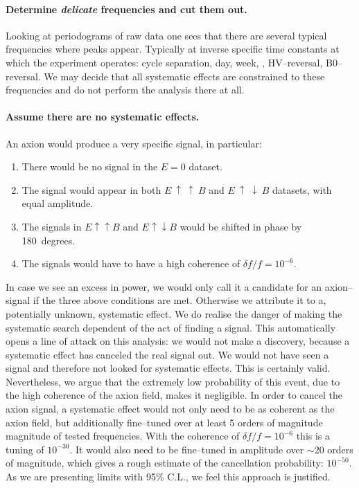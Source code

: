 \paragraph{Determine \emph{delicate} frequencies and cut them out.}
Looking at periodograms of raw data one sees that there are several typical frequencies where peaks appear. Typically at inverse specific time constants at which the experiment operates: cycle separation, day, week, , HV--reversal, B0--reversal. We may decide that all systematic effects are constrained to these frequencies and do not perform the analysis there at all.

\paragraph{Assume there are no systematic effects.}
An axion would produce a very specific signal, in particular:
\begin{enumerate}
  \item There would be no signal in the $E=0$ dataset.
  \item The signal would appear in both $E~\uparrow~\uparrow~B$ and $E~\uparrow~\downarrow~B$ datasets, with equal amplitude.
  \item The signals in $E \uparrow \uparrow B$ and $E \uparrow \downarrow B$ would be shifted in phase by 180~degrees.
  \item The signals would have to have a high coherence of $\delta f / f = 10^{-6}$.
\end{enumerate}
In case we see an excess in power, we would only call it a candidate for an axion--signal if the three above conditions are met. Otherwise we attribute it to a, potentially unknown, systematic effect. We do realise the danger of making the systematic search dependent of the act of finding a signal. This automatically opens a line of attack on this analysis: we would not make a discovery, because a systematic effect has canceled the real signal out. We would not have seen a signal and therefore not looked for systematic effects. This is certainly valid. Nevertheless, we argue that the extremely low probability of this event, due to the high coherence of the axion field, makes it negligible. In order to cancel the axion signal, a systematic effect would not only need to be as coherent as the axion field, but additionally fine--tuned over at least 5 orders of magnitude magnitude of tested frequencies. With the coherence of $\delta f / f = 10^{-6}$ this is a tuning of $10^{-30}$. It would also need to be fine--tuned in amplitude over $\sim 20$ orders of magnitude, which gives a rough estimate of the cancellation probability: $10^{-50}$. As we are presenting limits with 95\% C.L., we feel this approach is justified.


